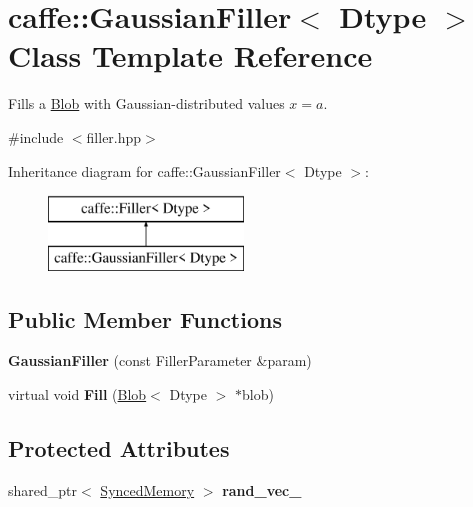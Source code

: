 \hypertarget{classcaffe_1_1GaussianFiller}{}\section{caffe\+:\+:Gaussian\+Filler$<$ Dtype $>$ Class Template Reference}
\label{classcaffe_1_1GaussianFiller}


Fills a \hyperlink{classcaffe_1_1Blob}{Blob} with Gaussian-\/distributed values $ x = a $.  




{\ttfamily \#include $<$filler.\+hpp$>$}

Inheritance diagram for caffe\+:\+:Gaussian\+Filler$<$ Dtype $>$\+:\begin{figure}[H]
\begin{center}
\leavevmode
\includegraphics[height=2.000000cm]{classcaffe_1_1GaussianFiller}
\end{center}
\end{figure}
\subsection*{Public Member Functions}
\begin{DoxyCompactItemize}
\item 
{\bfseries Gaussian\+Filler} (const Filler\+Parameter \&param)\hypertarget{classcaffe_1_1GaussianFiller_a37a676739d64cf07b61767c99dd821b2}{}\label{classcaffe_1_1GaussianFiller_a37a676739d64cf07b61767c99dd821b2}

\item 
virtual void {\bfseries Fill} (\hyperlink{classcaffe_1_1Blob}{Blob}$<$ Dtype $>$ $\ast$blob)\hypertarget{classcaffe_1_1GaussianFiller_ac45d5d0695521d7d71a4d5bccb659f21}{}\label{classcaffe_1_1GaussianFiller_ac45d5d0695521d7d71a4d5bccb659f21}

\end{DoxyCompactItemize}
\subsection*{Protected Attributes}
\begin{DoxyCompactItemize}
\item 
shared\+\_\+ptr$<$ \hyperlink{classcaffe_1_1SyncedMemory}{Synced\+Memory} $>$ {\bfseries rand\+\_\+vec\+\_\+}\hypertarget{classcaffe_1_1GaussianFiller_afec462a3671a2ad0cc09b6149be0b63c}{}\label{classcaffe_1_1GaussianFiller_afec462a3671a2ad0cc09b6149be0b63c}

\end{DoxyCompactItemize}


